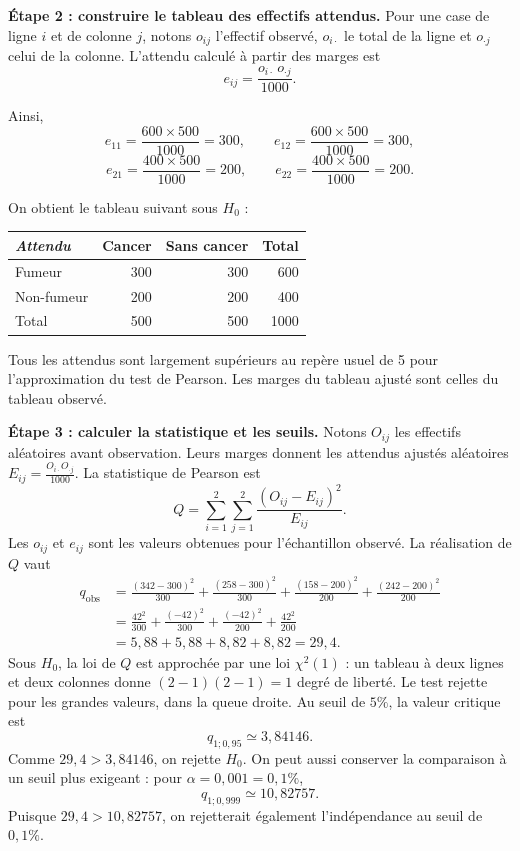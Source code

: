 {{\begin{minipage}{\linewidth}
\textbf{Étape 2 : construire le tableau des effectifs attendus.} Pour une case de ligne $i$ et de colonne $j$, notons $o_{ij}$ l'effectif observé, $o_{i\cdot}$ le total de la ligne et $o_{\cdot j}$ celui de la colonne. L'attendu calculé à partir des marges est
\[
e_{ij}=\frac{o_{i\cdot}\,o_{\cdot j}}{1000}.
\]
\end{minipage}\par
Ainsi,
\[
e_{11}=\frac{600\times500}{1000}=300,\qquad
 e_{12}=\frac{600\times500}{1000}=300,
\]
\[
e_{21}=\frac{400\times500}{1000}=200,\qquad
 e_{22}=\frac{400\times500}{1000}=200.
\]
\begin{minipage}{\linewidth}
On obtient le tableau suivant sous $H_0$ :
\begin{center}
\begin{tabular}{lrrr}\hline
\emph{Attendu} & Cancer & Sans cancer & Total \\ \hline
Fumeur & 300 & 300 & 600 \\
Non-fumeur & 200 & 200 & 400 \\ \hline
Total & 500 & 500 & 1000 \\ \hline
\end{tabular}
\end{center}
\end{minipage}
Tous les attendus sont largement supérieurs au repère usuel de 5 pour l'approximation du test de Pearson. Les marges du tableau ajusté sont celles du tableau observé.

\textbf{Étape 3 : calculer la statistique et les seuils.} Notons $O_{ij}$ les effectifs aléatoires avant observation. Leurs marges donnent les attendus ajustés aléatoires $E_{ij}=\frac{O_{i\cdot}O_{\cdot j}}{1000}$. La statistique de Pearson est
\[
Q=\sum_{i=1}^2\sum_{j=1}^2\frac{(O_{ij}-E_{ij})^2}{E_{ij}}.
\]
Les $o_{ij}$ et $e_{ij}$ sont les valeurs obtenues pour l'échantillon observé. La réalisation de $Q$ vaut
\begin{align*}
q_{\mathrm{obs}}
&=\frac{(342-300)^2}{300}+\frac{(258-300)^2}{300}
 +\frac{(158-200)^2}{200}+\frac{(242-200)^2}{200}\\
&=\frac{42^2}{300}+\frac{(-42)^2}{300}
 +\frac{(-42)^2}{200}+\frac{42^2}{200}\\
&=5{,}88+5{,}88+8{,}82+8{,}82=29{,}4.
\end{align*}
Sous $H_0$, la loi de $Q$ est approchée par une loi $\chi^2(1)$ : un tableau à deux lignes et deux colonnes donne $(2-1)(2-1)=1$ degré de liberté. Le test rejette pour les grandes valeurs, dans la queue droite.
Au seuil de $5\%$, la valeur critique est
\[
q_{1;0{,}95}\simeq3{,}84146.
\]
Comme $29{,}4>3{,}84146$, on rejette $H_0$. On peut aussi conserver la comparaison à un seuil plus exigeant : pour $\alpha=0{,}001=0{,}1\%$,
\[
q_{1;0{,}999}\simeq10{,}82757.
\]
Puisque $29{,}4>10{,}82757$, on rejetterait également l'indépendance au seuil de $0{,}1\%$.

}}
